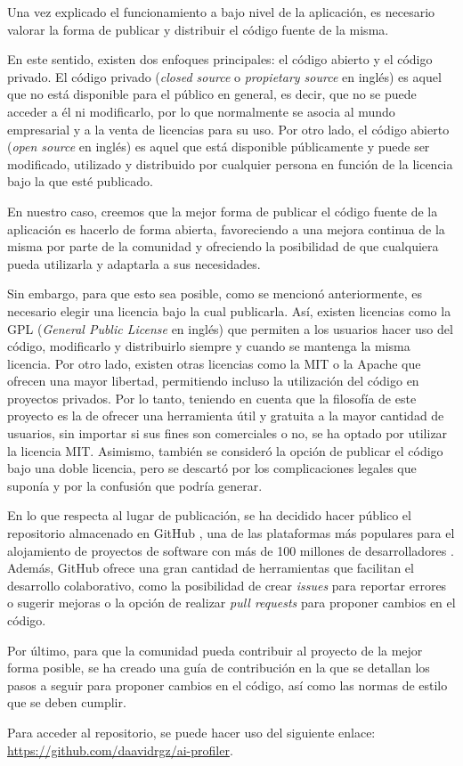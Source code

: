 Una vez explicado el funcionamiento a bajo nivel de la aplicación, es necesario valorar la forma de publicar y
distribuir el código fuente de la misma.

\bigskip
En este sentido, existen dos enfoques principales: el código abierto y el código privado.
El código privado (\textit{closed source} o \textit{propietary source} en inglés) es aquel que no está disponible para el público en general, es decir, que no se puede acceder a él ni
modificarlo, por lo que normalmente se asocia al mundo empresarial y a la venta de licencias para su uso.
Por otro lado, el código abierto (\textit{open source} en inglés) es aquel que
está disponible públicamente y puede ser modificado, utilizado y distribuido por cualquier persona en función
de la licencia bajo la que esté publicado.

\bigskip
En nuestro caso, creemos que la mejor forma de publicar el código fuente de la aplicación es hacerlo de forma abierta,
favoreciendo a una mejora continua de la misma por parte de la comunidad y ofreciendo la posibilidad de que cualquiera pueda
utilizarla y adaptarla a sus necesidades.

\bigskip
Sin embargo, para que esto sea posible, como se mencionó anteriormente, es necesario elegir una licencia bajo la cual publicarla. Así, existen licencias
como la GPL (\textit{General Public License} en inglés) \cite{gpl} que permiten a los usuarios hacer uso del código, modificarlo y distribuirlo
siempre y cuando se mantenga la misma licencia. Por otro lado, existen otras licencias como la MIT \cite{mitlicense} o la Apache \cite{apachelicense} que ofrecen una mayor libertad,
permitiendo incluso la utilización del código en proyectos privados. Por lo tanto, teniendo en cuenta que la filosofía de este proyecto es la de ofrecer una herramienta útil y gratuita a la mayor
cantidad de usuarios, sin importar si sus fines son comerciales o no, se ha optado por utilizar la licencia MIT. Asimismo, también se consideró la opción de publicar el código
bajo una doble licencia, pero se descartó por los complicaciones legales que suponía y por la confusión que podría generar.

\bigskip
En lo que respecta al lugar de publicación, se ha decidido hacer público el repositorio almacenado en GitHub \cite{github}, una de las
plataformas más populares para el alojamiento de proyectos de software con más de 100 millones de desarrolladores \cite{100milliongithub}.
Además, GitHub ofrece una gran cantidad de herramientas que facilitan el desarrollo colaborativo, como la posibilidad de crear \textit{issues} para
reportar errores o sugerir mejoras o la opción de realizar \textit{pull requests} para proponer cambios en el código.

\bigskip
Por último, para que la comunidad pueda contribuir al proyecto de la mejor forma posible, se ha creado una guía de contribución
en la que se detallan los pasos a seguir para proponer cambios en el código, así como las normas de estilo que se deben cumplir.

\bigskip
Para acceder al repositorio, se puede hacer uso del siguiente enlace: \url{https://github.com/daavidrgz/ai-profiler}.
